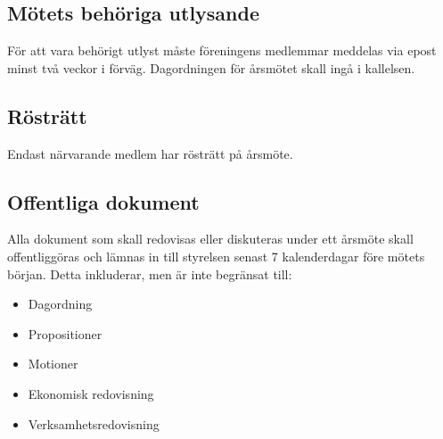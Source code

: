 \documentclass[11pt,a4paper]{article}
\begin{document}
\subsection{Mötets behöriga utlysande}
För att vara behörigt utlyst måste föreningens medlemmar meddelas via epost minst två veckor i förväg. Dagordningen för årsmötet skall ingå i kallelsen.
\subsection{Rösträtt}
Endast närvarande medlem har rösträtt på årsmöte.
\subsection{Offentliga dokument}
Alla dokument som skall redovisas eller diskuteras under ett årsmöte skall offentliggöras och lämnas in till styrelsen senast 7 kalenderdagar före mötets början.
Detta inkluderar, men är inte begränsat till:
\begin{itemize}
\item Dagordning
\item Propositioner
\item Motioner
\item Ekonomisk redovisning
\item Verksamhetsredovisning
\end{itemize}
\end{document}
